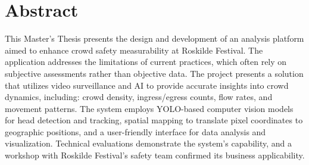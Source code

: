 \section*{Abstract}

This Master's Thesis presents the design and development of an analysis platform aimed to enhance crowd safety measurability at Roskilde Festival. The application addresses the limitations of current practices, which often rely on subjective assessments rather than objective data. The project presents a solution that utilizes video surveillance and AI to provide accurate insights into crowd dynamics, including: crowd density, ingress/egress counts, flow rates, and movement patterns. The system employs YOLO-based computer vision models for head detection and tracking, spatial mapping to translate pixel coordinates to geographic positions, and a user-friendly interface for data analysis and visualization. Technical evaluations demonstrate the system's capability, and a workshop with Roskilde Festival's safety team confirmed its business applicability.



